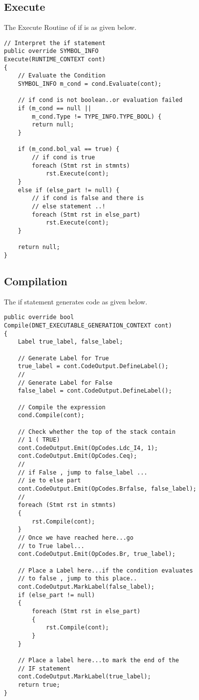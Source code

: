 \subsection{Execute}
The Execute Routine of if is as given below.
\lstset{style=csharp}
\begin{lstlisting}
// Interpret the if statement
public override SYMBOL_INFO 
Execute(RUNTIME_CONTEXT cont)
{
	// Evaluate the Condition
    SYMBOL_INFO m_cond = cond.Evaluate(cont);

    // if cond is not boolean..or evaluation failed
    if (m_cond == null || 
		m_cond.Type != TYPE_INFO.TYPE_BOOL) {
		return null;
	}
	
	if (m_cond.bol_val == true) {
		// if cond is true
		foreach (Stmt rst in stmnts)
			rst.Execute(cont);
	}
	else if (else_part != null) {
		// if cond is false and there is 
		// else statement ..!
		foreach (Stmt rst in else_part)
			rst.Execute(cont);
	}
	
	return null;
}
\end{lstlisting}
\subsection{Compilation}
The if statement generates code as given below.
\lstset{style=csharp}
\begin{lstlisting}
public override bool 
Compile(DNET_EXECUTABLE_GENERATION_CONTEXT cont)
{
	Label true_label, false_label;
	
	// Generate Label for True
	true_label = cont.CodeOutput.DefineLabel();
	//
	// Generate Label for False
	false_label = cont.CodeOutput.DefineLabel();
		
	// Compile the expression
	cond.Compile(cont);
	
	// Check whether the top of the stack contain
	// 1 ( TRUE)
	cont.CodeOutput.Emit(OpCodes.Ldc_I4, 1);
	cont.CodeOutput.Emit(OpCodes.Ceq);
	//
	// if False , jump to false_label ...
	// ie to else part
	cont.CodeOutput.Emit(OpCodes.Brfalse, false_label);
	//
	foreach (Stmt rst in stmnts)
	{
		rst.Compile(cont);
	}
	// Once we have reached here...go
	// to True label...
	cont.CodeOutput.Emit(OpCodes.Br, true_label);
	
	// Place a Label here...if the condition evaluates
	// to false , jump to this place..
	cont.CodeOutput.MarkLabel(false_label);
	if (else_part != null)
	{
		foreach (Stmt rst in else_part)
		{
			rst.Compile(cont);
		}
	}

	// Place a label here...to mark the end of the
	// IF statement
	cont.CodeOutput.MarkLabel(true_label);
	return true;
}
\end{lstlisting}

